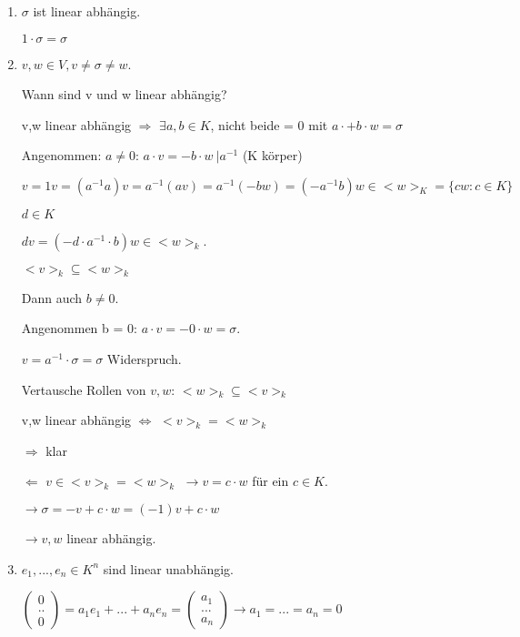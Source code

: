 \documentclass[a4paper, openany]{book}
\begin{document}
    \begin{enumerate}[label=(\alph*)]
      \item $\sigma$ ist linear abhängig.

      $1 \cdot \sigma = \sigma$

      \item $v,w \in V, v \neq \sigma \neq w$.

      Wann sind v und w linear abhängig?

      v,w linear abhängig $\Rightarrow$ $\exists a,b \in K$, nicht beide = 0 mit $a \cdot + b \cdot w = \sigma$

      Angenommen: $a \neq 0$: $a \cdot v = -b \cdot w \ | a^{-1}$ (K körper)

      $v = 1v = (a^{-1}a)v = a^{-1}(av) = a^{-1}(-bw) = (-a^{-1}b) w \in <w>_K = \{cw : c \in K\}$

      $d \in K$

      $d v = (-d \cdot a^{-1} \cdot b) w \in <w>_k$.

      $<v>_k \subseteq <w>_k$

      Dann auch $b \neq 0$.

      Angenommen b = 0: $a \cdot v = -0 \cdot w = \sigma$.

      $v = a^{-1} \cdot \sigma = \sigma$ Widerspruch. 

      Vertausche Rollen von $v,w$: $<w>_k \subseteq <v>_k$

      v,w linear abhängig $\Leftrightarrow$ $<v>_k = <w>_k$

      $\Rightarrow$ klar

      $\Leftarrow$ $v \in <v>_k = <w>_k$ $\rightarrow v = c \cdot w$ für ein $c \in K$.                                                    

      $\rightarrow \sigma = -v + c \cdot w = (-1) v + c \cdot w$

      $\rightarrow v,w$ linear abhängig.

      \item $e_1,...,e_n \in K^n$ sind linear unabhängig.

      $\begin{pmatrix} 0 \\ .. \\ 0 \end{pmatrix} = a_1e_1 + ... + a_ne_n  = \begin{pmatrix}a_1 \\ ... \\ a_n \end{pmatrix} \rightarrow a_1 = ... = a_n = 0$


\end{enumerate}
\end{document}
